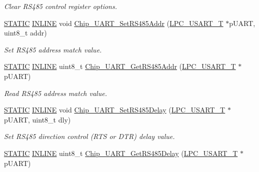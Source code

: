 \begin{DoxyCompactItemize}
\begin{DoxyCompactList}\small\item\em Clear R\+S485 control register options. \end{DoxyCompactList}\item 
\hyperlink{group___l_p_c___types___public___macros_ga10b2d890d871e1489bb02b7e70d9bdfb}{S\+T\+A\+T\+IC} \hyperlink{spifi__18xx__43xx_8h_a2eb6f9e0395b47b8d5e3eeae4fe0c116}{I\+N\+L\+I\+NE} void \hyperlink{group___u_a_r_t__18_x_x__43_x_x_ga72a3d146a8d6f8a8276080f91c3703e1}{Chip\+\_\+\+U\+A\+R\+T\+\_\+\+Set\+R\+S485\+Addr} (\hyperlink{struct_l_p_c___u_s_a_r_t___t}{L\+P\+C\+\_\+\+U\+S\+A\+R\+T\+\_\+T} $\ast$p\+U\+A\+RT, uint8\+\_\+t addr)
\begin{DoxyCompactList}\small\item\em Set R\+S485 address match value. \end{DoxyCompactList}\item 
\hyperlink{group___l_p_c___types___public___macros_ga10b2d890d871e1489bb02b7e70d9bdfb}{S\+T\+A\+T\+IC} \hyperlink{spifi__18xx__43xx_8h_a2eb6f9e0395b47b8d5e3eeae4fe0c116}{I\+N\+L\+I\+NE} uint8\+\_\+t \hyperlink{group___u_a_r_t__18_x_x__43_x_x_ga1c96142bb767ca604ad468977c5e546c}{Chip\+\_\+\+U\+A\+R\+T\+\_\+\+Get\+R\+S485\+Addr} (\hyperlink{struct_l_p_c___u_s_a_r_t___t}{L\+P\+C\+\_\+\+U\+S\+A\+R\+T\+\_\+T} $\ast$p\+U\+A\+RT)
\begin{DoxyCompactList}\small\item\em Read R\+S485 address match value. \end{DoxyCompactList}\item 
\hyperlink{group___l_p_c___types___public___macros_ga10b2d890d871e1489bb02b7e70d9bdfb}{S\+T\+A\+T\+IC} \hyperlink{spifi__18xx__43xx_8h_a2eb6f9e0395b47b8d5e3eeae4fe0c116}{I\+N\+L\+I\+NE} void \hyperlink{group___u_a_r_t__18_x_x__43_x_x_ga4aa983b3f076828ee460a1c7146b3eac}{Chip\+\_\+\+U\+A\+R\+T\+\_\+\+Set\+R\+S485\+Delay} (\hyperlink{struct_l_p_c___u_s_a_r_t___t}{L\+P\+C\+\_\+\+U\+S\+A\+R\+T\+\_\+T} $\ast$p\+U\+A\+RT, uint8\+\_\+t dly)
\begin{DoxyCompactList}\small\item\em Set R\+S485 direction control (R\+TS or D\+TR) delay value. \end{DoxyCompactList}\item 
\hyperlink{group___l_p_c___types___public___macros_ga10b2d890d871e1489bb02b7e70d9bdfb}{S\+T\+A\+T\+IC} \hyperlink{spifi__18xx__43xx_8h_a2eb6f9e0395b47b8d5e3eeae4fe0c116}{I\+N\+L\+I\+NE} uint8\+\_\+t \hyperlink{group___u_a_r_t__18_x_x__43_x_x_ga5394200f985c69d25fd0c7434588cf88}{Chip\+\_\+\+U\+A\+R\+T\+\_\+\+Get\+R\+S485\+Delay} (\hyperlink{struct_l_p_c___u_s_a_r_t___t}{L\+P\+C\+\_\+\+U\+S\+A\+R\+T\+\_\+T} $\ast$p\+U\+A\+RT)

\end{DoxyCompactItemize}
